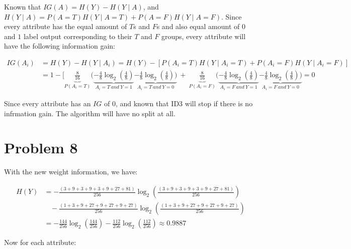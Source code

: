 \documentclass[12pt]{article}
\begin{document}
Known that $IG(A) = H(Y) - H(Y \mid A)$, and $H(Y \mid A) = P(A = T)H(Y \mid A = T) + P(A = F)H(Y \mid A = F)$. Since every attribute has the equal amount of $T$s and $F$s and also equal amount of $0$ and $1$ label output corresponding to their $T$ and $F$ groups, every attribute will have the following information gain:

\begin{align*}
    IG(A_i) &= H(Y) - H(Y \mid A_i) = H(Y) - [P(A_i = T)H(Y \mid A_i = T) + P(A_i = F)H(Y \mid A_i = F)] \\
    &= 1 - [\underbrace{\frac{8}{16}}_{P(A_i = T)}(\underbrace{-\frac{4}{8} \log_2(\frac{4}{8})}_{A_i = T \ and \ Y = 1}  \underbrace{-\frac{4}{8} \log_2(\frac{4}{8}))}_{{A_i = T \ and \ Y = 0}} \ + \ \underbrace{\frac{8}{16}}_{P(A_i = F)}(\underbrace{-\frac{4}{8} \log_2(\frac{4}{8})}_{A_i = F \ and \ Y = 1}  \underbrace{-\frac{4}{8} \log_2(\frac{4}{8}))}_{{A_i = F \ and \ Y = 0}}= 0
\end{align*}

Since every attribute has an $IG$ of $0$, and known that ID3 will stop if there is no infrmation gain. The algorithm will have no split at all.

\section{Problem 8}

With the new weight information, we have:

\begin{align*}
    H(Y) &= - \frac{(3 + 9 + 3 +9 +3 +9 + 27 + 81)}{256}\log_2(\frac{(3 + 9 + 3 +9 +3 +9 + 27 + 81)}{256}) \\ &\ \ \ \  - \frac{(1 + 3 + 9 + 27 + 9 + 27 + 9 + 27)}{256}\log_2(\frac{(1 + 3 + 9 + 27 + 9 + 27 + 9 + 27)}{256}) \\
    &= - \frac{144}{256} \log_2(\frac{144}{256}) - \frac{112}{256} \log_2(\frac{112}{256}) \approx 0.9887
\end{align*}

Now for each attribute:
\end{document}
